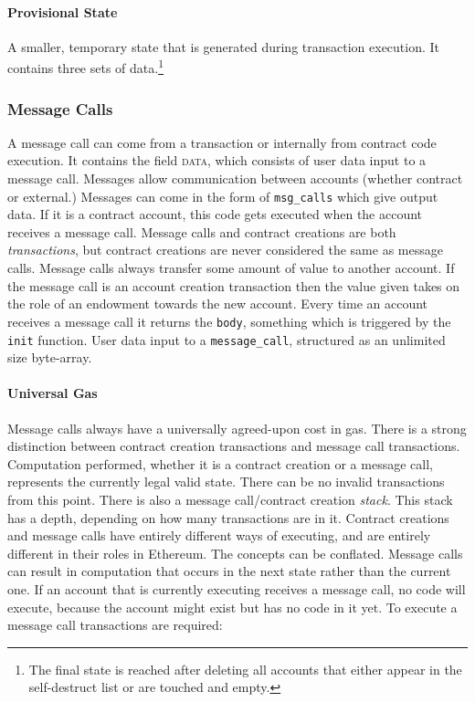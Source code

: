 \documentclass[10pt,letterpaper,leqno,bibliography=totoc]{scrartcl}
\newenvironment{alphafootnotes}
{\par\edef\savedfootnotenumber{\number\value{footnote}}
\renewcommand{\thefootnote}{\alph{footnote}}
\setcounter{footnote}{0}}
{\par\setcounter{footnote}{\savedfootnotenumber}}
\begin{document}
\begin{alphafootnotes}
\begin{multicols*}{2}
				\paragraph{Provisional State}
				A smaller, temporary state that is generated during transaction execution. It contains three sets of data.\footnote{The final state is reached after deleting all accounts that either appear in the self-destruct list or are touched and empty.}

			\subsubsection{Message Calls}
			A message call can come from a transaction or internally from contract code execution. It contains the field \textsc{data}, which consists of user data input to a message call. Messages allow communication between accounts (whether contract or external.) Messages can come in the form of \texttt{msg\_calls} which give output data. If it is a contract account, this code gets executed when the account receives a message call. Message calls and contract creations are both \textsl{transactions}, but contract creations are never considered the same as message calls. Message calls always transfer some amount of value to another account. If the message call is an account creation transaction then the value given takes on the role of an endowment towards the new account. Every time an account receives a message call it returns the \texttt{body}, something which is triggered by the \texttt{init} function. User data input to a \texttt{message\_call}, structured as an unlimited size byte-array.

\paragraph{Universal Gas}Message calls always have a universally agreed-upon cost in gas. There is a strong distinction between contract creation transactions and message call transactions. Computation performed, whether it is a contract creation or a message call, represents the currently legal valid state. There can be no invalid transactions from this point. \supercite{Wood2017} There is also a message call/contract creation \textit{stack}. This stack has a depth, depending on how many transactions are in it. Contract creations and message calls have entirely different ways of executing, and are entirely different in their roles in Ethereum. The concepts can be conflated. Message calls can result in computation that occurs in the next state rather than the current one. If an account that is currently executing receives a message call, no code will execute, because the account might exist but has no code in it yet. To execute a message call transactions are required:


\end{multicols*}
\end{alphafootnotes}
\end{document}
